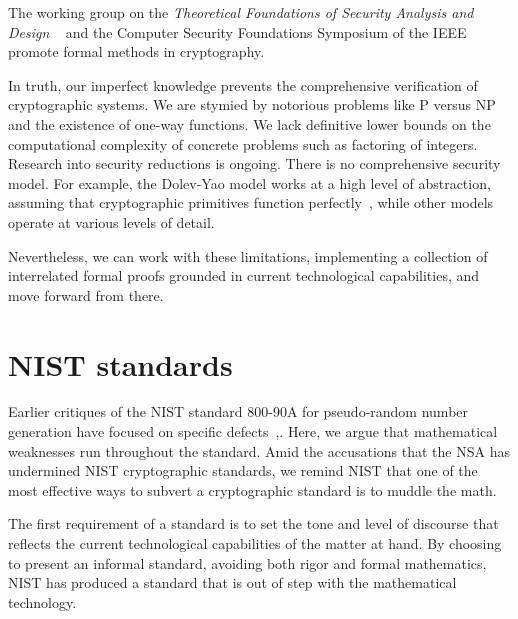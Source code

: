 \documentclass[11pt]{amsart} %
\begin{document}
The working group on the {\it Theoretical Foundations of Security
Analysis and Design}
~\cite{TFSAD}
and the Computer Security Foundations Symposium of the IEEE~\cite{CSF2013} promote formal methods in cryptography.

In truth, our imperfect knowledge prevents the
comprehensive verification of cryptographic systems.
We are stymied by notorious problems like
P versus NP  and the existence of one-way functions.  
We lack definitive lower bounds on the computational complexity of concrete problems such as
factoring of integers.
Research into security reductions is ongoing.  
There is no comprehensive security model.  
For example, the Dolev-Yao model works at a high level of abstraction, assuming that cryptographic primitives function perfectly~\cite{DY},
while other models operate at various levels of detail.

Nevertheless, we can work with these limitations, implementing a collection of interrelated formal proofs
grounded in current technological capabilities, and move forward from there.


\section{NIST standards}

Earlier critiques of the NIST standard 800-90A for pseudo-random number
generation have focused on specific
defects~\cite{Green-EC},\cite{2006-190}.  Here, we argue that 
mathematical weaknesses run throughout the standard.  Amid the accusations that the NSA has undermined NIST
cryptographic standards, we remind NIST that one of the most effective ways to subvert a cryptographic standard is to 
muddle the math.

The first requirement of a standard is to set the tone and level of discourse that reflects the current
technological capabilities of the matter at hand.  By choosing to present an informal standard, 
avoiding both rigor and formal mathematics,
NIST has produced a standard that is out of step with the mathematical technology.
\end{document}
